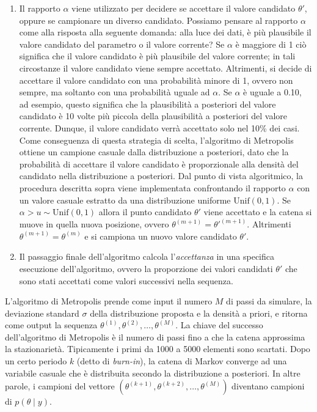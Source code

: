 \documentclass[
]{memoir}
\begin{document}
\begin{enumerate}
\def\labelenumi{(\alph{enumi})}
\setcounter{enumi}{3}
\item
  Il rapporto \(\alpha\) viene utilizzato per decidere se accettare il valore candidato \(\theta'\), oppure se campionare un diverso candidato. Possiamo pensare al rapporto \(\alpha\) come alla risposta alla seguente domanda: alla luce dei dati, è più plausibile il valore candidato del parametro o il valore corrente? Se \(\alpha\) è maggiore di 1 ciò significa che il valore candidato è più plausibile del valore corrente; in tali circostanze il valore candidato viene sempre accettato. Altrimenti, si decide di accettare il valore candidato con una probabilità minore di 1, ovvero non sempre, ma soltanto con una probabilità uguale ad \(\alpha\). Se \(\alpha\) è uguale a 0.10, ad esempio, questo significa che la plausibilità a posteriori del valore candidato è 10 volte più piccola della plausibilità a posteriori del valore corrente. Dunque, il valore candidato verrà accettato solo nel 10\% dei casi. Come conseguenza di questa strategia di scelta, l'algoritmo di Metropolis ottiene un campione casuale dalla distribuzione a posteriori, dato che la probabilità di accettare il valore candidato è proporzionale alla densità del candidato nella distribuzione a posteriori. Dal punto di vista algoritmico, la procedura descritta sopra viene implementata confrontando il rapporto \(\alpha\) con un valore casuale estratto da una distribuzione uniforme \(\mbox{Unif}(0, 1)\). Se \(\alpha > u \sim \mbox{Unif}(0, 1)\) allora il punto candidato \(\theta'\) viene accettato e la catena si muove in quella nuova posizione, ovvero \(\theta^{(m+1)} = \theta'^{(m+1)}\). Altrimenti \(\theta^{(m+1)} = \theta^{(m)}\) e si campiona un nuovo valore candidato \(\theta'\).
\item
  Il passaggio finale dell'algoritmo calcola l'\emph{accettanza} in una specifica esecuzione dell'algoritmo, ovvero la proporzione dei valori candidati \(\theta'\) che sono stati accettati come valori successivi nella sequenza.
\end{enumerate}

L'algoritmo di Metropolis prende come input il numero \(M\) di passi da simulare, la deviazione standard \(\sigma\) della distribuzione proposta e la densità a priori, e ritorna come output la sequenza \(\theta^{(1)}, \theta^{(2)}, \dots, \theta^{(M)}\). La chiave del successo dell'algoritmo di Metropolis è il numero di passi fino a che la catena approssima la stazionarietà. Tipicamente i primi da 1000 a 5000 elementi sono scartati. Dopo un certo periodo \(k\) (detto di \emph{burn-in}), la catena di Markov converge ad una variabile casuale che è distribuita secondo la distribuzione a posteriori. In altre parole, i campioni del vettore \(\left(\theta^{(k+1)}, \theta^{(k+2)}, \dots, \theta^{(M)}\right)\) diventano campioni di \(p(\theta \mid y)\).
\end{document}
